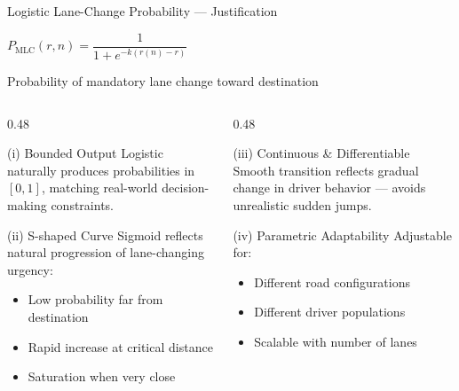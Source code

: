 \documentclass[11pt,aspectratio=169]{beamer}
\begin{document}
\begin{frame}[shrink=5]{Logistic Lane-Change Probability --- Justification}
\begin{center}
{\large $P_{\text{MLC}}(r, n) = \dfrac{1}{1 + e^{-k(r(n) - r)}}$}

\vspace{0.2em}
{\small Probability of mandatory lane change toward destination}
\end{center}

\vspace{0.3em}
\begin{columns}[T]
\begin{column}{0.48\textwidth}
\begin{block}{(i) Bounded Output}
{\small Logistic naturally produces probabilities in $[0,1]$, matching real-world decision-making constraints.}
\end{block}

\vspace{0.3em}
\begin{block}{(ii) S-shaped Curve}
{\small Sigmoid reflects natural progression of lane-changing urgency:}
\begin{itemize}
\item[\scriptsize$\bullet$] {\scriptsize Low probability far from destination}
\item[\scriptsize$\bullet$] {\scriptsize Rapid increase at critical distance}
\item[\scriptsize$\bullet$] {\scriptsize Saturation when very close}
\end{itemize}
\end{block}
\end{column}
\begin{column}{0.48\textwidth}
\begin{block}{(iii) Continuous \& Differentiable}
{\small Smooth transition reflects gradual change in driver behavior --- avoids unrealistic sudden jumps.}
\end{block}

\vspace{0.3em}
\begin{block}{(iv) Parametric Adaptability}
{\small Adjustable for:}
\begin{itemize}
\item[\scriptsize$\bullet$] {\scriptsize Different road configurations}
\item[\scriptsize$\bullet$] {\scriptsize Different driver populations}
\item[\scriptsize$\bullet$] {\scriptsize Scalable with number of lanes}
\end{itemize}
\end{block}
\end{column}
\end{columns}
\end{frame}
\end{document}
